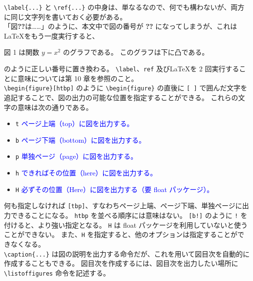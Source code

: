 \verb`\label{...}` と \verb`\ref{...}` の中身は、単なるなので、何でも構わないが、両方に同じ文字列を書いておく必要がある。\\

「図\textbf{??}は……」のように、本文中で図の番号が \textbf{??} になってしまうが、これは\LaTeX{}をもう一度実行すると、
\begin{mdframed}[roundcorner=0.50zw,leftmargin=3.00zw,rightmargin=3.00zw,skipabove=0.40zw,skipbelow=0.40zw,innertopmargin=4.00pt,innerbottommargin=4.00pt,innerleftmargin=5.00pt,innerrightmargin=5.00pt,linecolor=gray!100,linewidth=0.50pt,backgroundcolor=gray!00]
図 1 は関数 $y = x^{2}$ のグラフである。
このグラフは下に凸である。
\end{mdframed}
のように正しい番号に置き換わる。
\verb`\label`、\verb`ref` 及び\LaTeX{}を 2 回実行することに意味については第 10 章を参照のこと。\\

\verb`\begin{figure}[htbp]` のように \verb`\begin{figure}` の直後に \verb`[ ]` で囲んだ文字を追記することで、図の出力の可能な位置を指定することができる。
これらの文字の意味は次の通りである。
\begin{itemize}\setlength{\leftskip}{-1.00zw}%
\item \texttt{t}  \textcolor{blue}{ページ上端（top）に図を出力する。}
\item \texttt{b}  \textcolor{blue}{ページ下端（bottom）に図を出力する。}
\item \texttt{p}  \textcolor{blue}{単独ページ（page）に図を出力する。}
\item \texttt{h}  \textcolor{blue}{できればその位置（here）に図を出力する。}
\item \texttt{H}  \textcolor{blue}{必ずその位置（Here）に図を出力する（要 float パッケージ）。}
\end{itemize}
何も指定しなければ \texttt{[tbp]}、すなわちページ上端、ページ下端、単独ページに出力できることになる。
\texttt{htbp} を並べる順序には意味はない。
\texttt{[b!]} のように \texttt{!} を付けると、より強い指定となる。
\texttt{H} は float パッケージを利用していないと使うことができない。
また、\texttt{H} を指定すると、他のオプションは指定することができなくなる。\\

\verb`\caption{...}` は図の説明を出力する命令だが、これを用いて図目次を自動的に作成することもできる。
図目次を作成するには、図目次を出力したい場所に \verb`\listoffigures` 命令を記述する。\\

